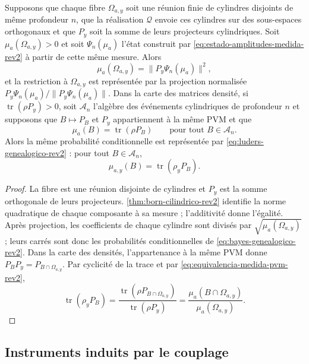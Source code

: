 \begin{theorem}
\label{thm:fibra-proyeccion-medida-rev2}
Supposons que chaque fibre \(\Omega_{a,y}\) soit une réunion finie de cylindres disjoints de même profondeur \(n\), que la réalisation \(\mathcal Q\) envoie ces cylindres sur des sous-espaces orthogonaux et que \(P_y\) soit la somme de leurs projecteurs cylindriques. Soit \(\mu_a(\Omega_{a,y})>0\) et soit \(\Psi_n(\mu_a)\) l’état construit par \eqref{eq:estado-amplitudes-medida-rev2} à partir de cette même mesure. Alors
\[
 \mu_a(\Omega_{a,y})=\|P_y\Psi_n(\mu_a)\|^2,
\]
et la restriction à \(\Omega_{a,y}\) est représentée par la projection normalisée \(P_y\Psi_n(\mu_a)/\|P_y\Psi_n(\mu_a)\|\). Dans la carte des matrices densité, si \(\operatorname{tr}(\rho P_y)>0\), soit \(\mathcal A_n\) l’algèbre des événements cylindriques de profondeur \(n\) et supposons que \(B\mapsto P_B\) et \(P_y\) appartiennent à la même PVM et que
\begin{equation}
 \mu_a(B)=\operatorname{tr}(\rho P_B)
 \qquad\text{pour tout }B\in\mathcal A_n.
 \label{eq:equivalencia-medida-pvm-rev2}
\end{equation}
Alors la même probabilité conditionnelle est représentée par \eqref{eq:luders-genealogico-rev2} : pour tout \(B\in\mathcal A_n\),
\[
 \mu_{a,y}(B)=\operatorname{tr}(\rho_yP_B).
\]
\end{theorem}

\begin{proof}
La fibre est une réunion disjointe de cylindres et \(P_y\) est la somme orthogonale de leurs projecteurs. \cref{thm:born-cilindrico-rev2} identifie la norme quadratique de chaque composante à sa mesure ; l’additivité donne l’égalité. Après projection, les coefficients de chaque cylindre sont divisés par \(\sqrt{\mu_a(\Omega_{a,y})}\) ; leurs carrés sont donc les probabilités conditionnelles de \eqref{eq:bayes-genealogico-rev2}. Dans la carte des densités, l’appartenance à la même PVM donne \(P_BP_y=P_{B\cap\Omega_{a,y}}\). Par cyclicité de la trace et par \eqref{eq:equivalencia-medida-pvm-rev2},
\[
 \operatorname{tr}(\rho_yP_B)
 =\frac{\operatorname{tr}(\rho P_{B\cap\Omega_{a,y}})}
        {\operatorname{tr}(\rho P_y)}
 =\frac{\mu_a(B\cap\Omega_{a,y})}{\mu_a(\Omega_{a,y})}.
\]
\end{proof}

\subsection{Instruments induits par le couplage}

